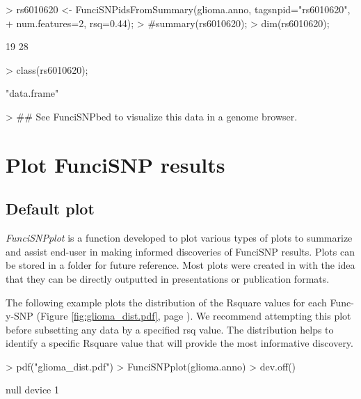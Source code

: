 \documentclass[12pt,fullpage]{article}
\newcommand{\Rmethod}[1]{{\textit{#1}}}
\begin{document}
\begin{Schunk}
\begin{Sinput}
> rs6010620 <- FunciSNPidsFromSummary(glioma.anno, tagsnpid="rs6010620",
+ num.features=2, rsq=0.44);
> #summary(rs6010620);
> dim(rs6010620);
\end{Sinput}
\begin{Soutput}
[1] 19 28
\end{Soutput}
\begin{Sinput}
> class(rs6010620);
\end{Sinput}
\begin{Soutput}
[1] "data.frame"
\end{Soutput}
\begin{Sinput}
> ## See FunciSNPbed to visualize this data in a genome browser.
\end{Sinput}
\end{Schunk}

\section{Plot FunciSNP results}
\subsection{Default plot}

\Rmethod{FunciSNPplot} is a function developed to plot various types of plots to
summarize and assist end-user in making informed discoveries of FunciSNP
results. Plots can be stored in a folder for future reference. Most plots were
created in with the idea that they can be directly outputted in presentations or
publication formats.

The following example plots the distribution of the Rsquare values for each
Func-y-SNP (Figure \ref{fig:glioma_dist.pdf}, page
        \pageref{fig:glioma_dist.pdf}). We recommend attempting this plot before
subsetting any data by a specified rsq value. The distribution helps to identify
a specific Rsquare value that will provide the most informative discovery.

\begin{Schunk}
\begin{Sinput}
> pdf("glioma_dist.pdf")
> FunciSNPplot(glioma.anno)
> dev.off()
\end{Sinput}
\begin{Soutput}
null device 
          1 
\end{Soutput}
\end{Schunk}
\end{document}
